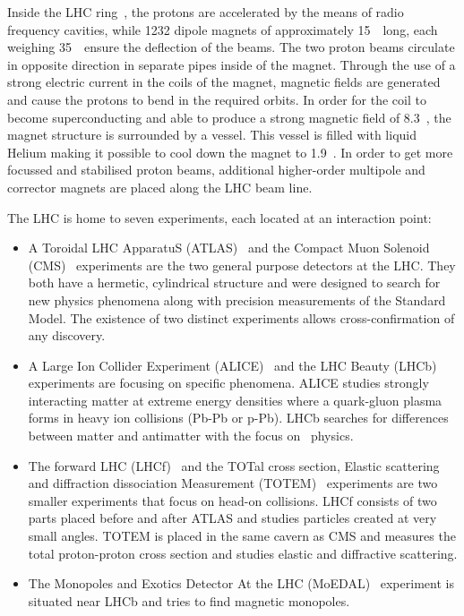 Inside the LHC ring~\cite{Bruning:782076}, the protons are accelerated by the means of radio frequency cavities, while 1232 dipole magnets of approximately 15~\m\ long, each weighing 35~\tonne\, ensure the deflection of the beams.  The two proton beams circulate in opposite direction in separate pipes inside of the magnet. Through the use of a strong electric current in the coils of the magnet, magnetic fields are generated and cause the protons to bend in the required orbits. In order for the coil to become superconducting and able to produce a strong magnetic field of 8.3~\tesla, the magnet structure is surrounded by a vessel. This vessel is filled with liquid Helium making it possible to cool down the magnet to 1.9~\kelvin. In order to get more focussed and stabilised proton beams, additional higher-order multipole and corrector magnets are placed along the LHC beam line.

  

The LHC is home to seven experiments, each located at an interaction point: 
\begin{itemize}
	\item A Toroidal LHC ApparatuS (ATLAS)~\cite{Aad:2008zzm} and the Compact Muon Solenoid (CMS)~\cite{Chatrchyan:2008aa} experiments are the two general purpose detectors at the LHC. They both have a hermetic, cylindrical structure and were designed to search for new physics phenomena along with precision measurements of the Standard Model. The existence of two distinct experiments allows cross-confirmation of any discovery. 
	\item A Large Ion Collider Experiment (ALICE)~\cite{Aamodt:2008zz} and the LHC Beauty (LHCb)~\cite{Alves:2008zz} experiments are focusing on specific phenomena. ALICE studies strongly interacting matter at extreme energy densities where a quark-gluon plasma forms in heavy ion collisions (Pb-Pb or p-Pb). LHCb searches for differences between matter and antimatter with the focus on \Pbottom\ physics.
	\item The forward LHC (LHCf)~\cite{Bongi:2010zz} and the TOTal cross section, Elastic scattering and diffraction dissociation Measurement (TOTEM)~\cite{Anelli:2008zza} experiments are two smaller experiments that focus on head-on collisions. LHCf consists of two parts placed before and after ATLAS and studies particles created at very small angles. TOTEM is placed in the same cavern as CMS and measures the total proton-proton cross section and studies elastic and diffractive scattering.  
		\item The Monopoles and Exotics Detector At the LHC (MoEDAL)~\cite{Acharya:2014nyr} experiment is situated near LHCb and tries to find magnetic monopoles. 
\end{itemize}




